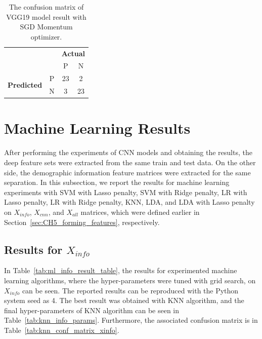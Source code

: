 \begin{table}[!h]
\centering
\caption{The confusion matrix of VGG19 model result with SGD Momentum optimizer.}
\label{tab:conf_vgg19}
\begin{tabular}{|cc|c|c|}
\cline{1-4}
                                                 &   & \multicolumn{2}{c|}{\textbf{Actual}} \\ \cline{3-4} 
                                                 &   & P            & N            \\ \hline
\multicolumn{1}{|c|}{\multirow{2}{*}{\textbf{Predicted}}} & P & 23           & 2            \\ \cline{2-4} 
\multicolumn{1}{|c|}{}                           & N & 3            & 23           \\ \hline
\end{tabular}
\end{table}

\section{Machine Learning Results}



After performing the experiments of CNN models and obtaining the results, the deep feature sets were extracted from the same train and test data. On the other side, the demographic information feature matrices were extracted for the same separation. In this subsection, we report the results for machine learning experiments with SVM with Lasso penalty, SVM with Ridge penalty, LR with Lasso penalty, LR with Ridge penalty, KNN, LDA, and LDA with Lasso penalty on $X_{info}$, $X_{cnn}$, and $X_{all}$ matrices, which were defined earlier in Section~\ref{sec:CH5_forming_features}, respectively.

\subsection{Results for $X_{info}$} \label{CH6:results_xinfo}

In Table~\ref{tab:ml_info_result_table}, the results for experimented machine learning algorithms, where the hyper-parameters were tuned with grid search, on $X_{info}$ can be seen. The reported results can be reproduced with the Python system seed as 4. The best result was obtained with KNN algorithm, and the final hyper-parameters of KNN algorithm can be seen in Table~\ref{tab:knn_info_params}. Furthermore, the associated confusion matrix is in Table~\ref{tab:knn_conf_matrix_xinfo}.

